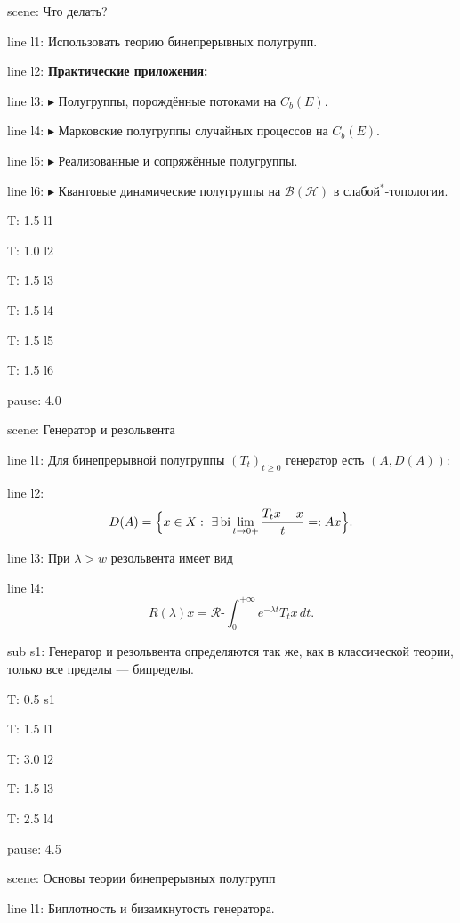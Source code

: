 \documentclass[a4paper,11pt]{article}
\newcommand{\Hilb}{\mathcal{H}}
\begin{document}

scene: {Что делать?}

line l1: {Использовать теорию бинепрерывных полугрупп.}

line l2: {\textbf{Практические приложения:}}

line l3: {{\color{yellow} $\blacktriangleright$ Полугруппы, порождённые потоками на $C_b(E)$.}}

line l4: {{\color{yellow} $\blacktriangleright$ Марковские полугруппы случайных процессов на $C_b(E)$.}}

line l5: {{\color{yellow} $\blacktriangleright$ Реализованные и сопряжённые полугруппы.}}

line l6: {{\color{yellow} $\blacktriangleright$ Квантовые динамические полугруппы на $\mathcal{B}(\Hilb)$ в слабой$^*$-топологии.}}


T: 1.5 l1

T: 1.0 l2

T: 1.5 l3

T: 1.5 l4

T: 1.5 l5

T: 1.5 l6

pause: 4.0



scene: {Генератор и резольвента}

line l1: {Для бинепрерывной полугруппы $(T_t)_{t\ge0}$ генератор есть $(A,D(A))$:}

line l2: {$$D(A)=\Bigl\{x\in X:\ \exists\operatorname{bi}\lim\limits_{t\to0+}\frac{T_t x-x}{t}=:Ax\Bigr\}.$$}

line l3: {При $\lambda>w$ резольвента имеет вид}

line l4: {$$R(\lambda)x=\mathcal{R}\text{-}\int_0^{+\infty}e^{-\lambda t}T_t x\,dt.$$}


sub s1: {Генератор и резольвента определяются так же, как в классической теории, только все пределы --- бипределы.}


T: 0.5 s1

T: 1.5 l1

T: 3.0 l2

T: 1.5 l3

T: 2.5 l4

pause: 4.5



scene: {Основы теории бинепрерывных полугрупп}

line l1: {Биплотность и бизамкнутость генератора.}
\end{document}
